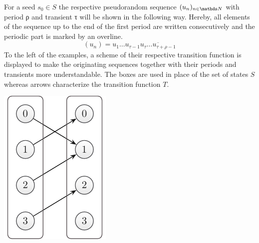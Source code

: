 \documentclass{stdlocal}
\begin{document}
    For a seed $s_0 \in S$ the respective pseudorandom sequence $(u_n)_{n\in\setNatural}$ with period ρ and transient τ will be shown in the following way.
    Hereby, all elements of the sequence up to the end of the first period are written consecutively and the periodic part is marked by an overline.
    \[
      (u_n) = u_1\ldots u_{τ-1} \overline{u_τ\ldots u_{τ+ρ-1}}
    \]
    To the left of the examples, a scheme of their respective transition function is displayed to make the originating sequences together with their periods and transients more understandable.
    The boxes are used in place of the set of states $S$ whereas arrows characterize the transition function $T$.

    \medskip
    \begin{minipage}{0.2\textwidth}
      \includegraphics[width=\textwidth]{figures/periodicity_example_a.pdf}
    \end{minipage}
\end{document}
